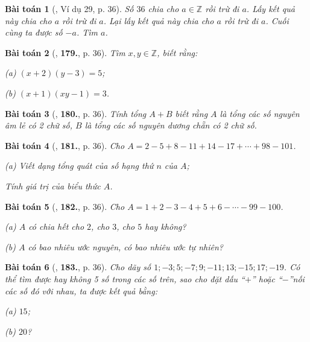 \documentclass{article}
\numberwithin{equation}{section}
\newtheorem{baitoan}{Bài toán}[section]
\begin{document}
\begin{baitoan}[\cite{Binh_Toan_6_tap_1}, Ví dụ 29, p. 36]
	Số $36$ chia cho $a\in\mathbb{Z}$ rồi trừ đi $a$. Lấy kết quả này chia cho $a$ rồi trừ đi $a$. Lại lấy kết quả này chia cho $a$ rồi trừ đi $a$. Cuối cùng ta được số $-a$. Tìm $a$.
\end{baitoan}

\begin{baitoan}[\cite{Binh_Toan_6_tap_1}, \textbf{179.}, p. 36]
	Tìm $x,y\in\mathbb{Z}$, biết rằng:
	\begin{enumerate*}
		\item[(a)] $(x + 2)(y - 3) = 5$;
		\item[(b)] $(x + 1)(xy - 1) = 3$.
	\end{enumerate*}
\end{baitoan}

\begin{baitoan}[\cite{Binh_Toan_6_tap_1}, \textbf{180.}, p. 36]
	Tính tổng $A + B$ biết rằng $A$ là tổng các số nguyên âm lẻ có 2 chữ số, $B$ là tổng các số nguyên dương chẵn có 2 chữ số.
\end{baitoan}

\begin{baitoan}[\cite{Binh_Toan_6_tap_1}, \textbf{181.}, p. 36]
	Cho $A = 2 - 5 + 8 - 11 + 14 - 17 + \cdots + 98 - 101$.
	\begin{enumerate*}
		\item[(a)] Viết dạng tổng quát của số hạng thứ $n$ của $A$;
		\item Tính giá trị của biểu thức $A$.
	\end{enumerate*}
\end{baitoan}

\begin{baitoan}[\cite{Binh_Toan_6_tap_1}, \textbf{182.}, p. 36]
	Cho $A = 1 + 2 - 3 - 4 + 5 + 6 - \cdots - 99 - 100$.
	\begin{enumerate*}
		\item[(a)] $A$ có chia hết cho $2$, cho $3$, cho $5$ hay không?
		\item[(b)] $A$ có bao nhiêu ước nguyên, có bao nhiêu ước tự nhiên?
	\end{enumerate*}
\end{baitoan}

\begin{baitoan}[\cite{Binh_Toan_6_tap_1}, \textbf{183.}, p. 36]
	Cho dãy số $1;-3;5;-7;9;-11;13;-15;17;-19$. Có thể tìm được hay không 5 số trong các số trên, sao cho đặt dấu ``$+$'' hoặc ``$-$''nối các số đó với nhau, ta được kết quả bằng:
	\begin{enumerate*}
		\item[(a)] $15$;
		\item[(b)] $20$?
	\end{enumerate*}
\end{baitoan}
\end{document}
